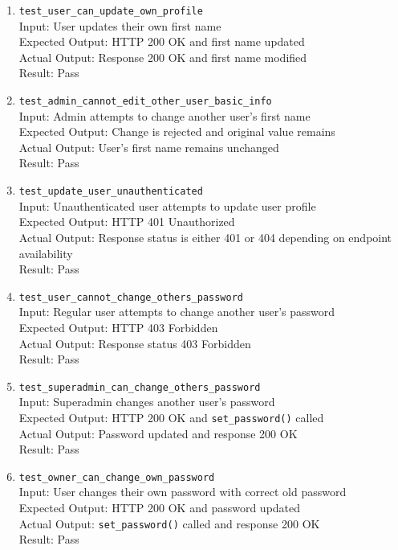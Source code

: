 \documentclass[12pt, titlepage]{article}
\begin{document}
\begin{enumerate}
    \\Actual Output: Response 200 OK and role remains unchanged
    \\Result: Pass
    \item \texttt{test\_user\_can\_update\_own\_profile} \label{test-user-update-own-profile}
    \\Input: User updates their own first name
    \\Expected Output: HTTP 200 OK and first name updated
    \\Actual Output: Response 200 OK and first name modified
    \\Result: Pass
    \item \texttt{test\_admin\_cannot\_edit\_other\_user\_basic\_info} \label{test-admin-edit-other-user}
    \\Input: Admin attempts to change another user's first name
    \\Expected Output: Change is rejected and original value remains
    \\Actual Output: User's first name remains unchanged
    \\Result: Pass
    \item \texttt{test\_update\_user\_unauthenticated} \label{test-update-user-unauthenticated}
    \\Input: Unauthenticated user attempts to update user profile
    \\Expected Output: HTTP 401 Unauthorized
    \\Actual Output: Response status is either 401 or 404 depending on endpoint availability
    \\Result: Pass
    \item \texttt{test\_user\_cannot\_change\_others\_password} \label{test-change-password-forbidden}
    \\Input: Regular user attempts to change another user's password
    \\Expected Output: HTTP 403 Forbidden
    \\Actual Output: Response status 403 Forbidden
    \\Result: Pass
    \item \texttt{test\_superadmin\_can\_change\_others\_password} \label{test-superadmin-change-password}
    \\Input: Superadmin changes another user's password
    \\Expected Output: HTTP 200 OK and \texttt{set\_password()} called
    \\Actual Output: Password updated and response 200 OK
    \\Result: Pass
    \item \texttt{test\_owner\_can\_change\_own\_password} \label{test-owner-change-password}
    \\Input: User changes their own password with correct old password
    \\Expected Output: HTTP 200 OK and password updated
    \\Actual Output: \texttt{set\_password()} called and response 200 OK
    \\Result: Pass
  \end{enumerate}
\end{document}
